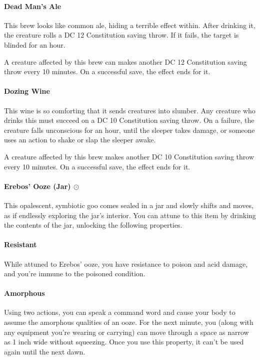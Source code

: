     \paragraph{Dead Man's Ale} %
        This brew looks like common ale, hiding a terrible effect within.
        After drinking it, the creature rolls a DC 12 Constitution saving throw.
        If it fails, the target is blinded for an hour.

        A creature affected by this brew can makes another DC 12 Constitution saving throw every 10 minutes.
        On a successful save, the effect ends for it.
    \paragraph{Dozing Wine} %
        This wine is so comforting that it sends creatures into slumber.
        Any creature who drinks this must succeed on a DC 10 Constitution saving throw.
        On a failure, the creature falls unconscious for an hour, until the sleeper takes damage, or someone uses an action to shake or slap the sleeper awake.

        A creature affected by this brew makes another DC 10 Constitution saving throw every 10 minutes.
        On a successful save, the effect ends for it.
    \paragraph{Erebos' Ooze (Jar) $\odot$} \label{item::erebosooze} %
        This opalescent, symbiotic goo comes sealed in a jar and slowly shifts and moves, as if endlessly exploring the jar's interior.
        You can attune to this item by drinking the contents of the jar, unlocking the following properties.

        \paragraph{Resistant} While attuned to Erebos' ooze, you have resistance to poison and acid damage, and you're immune to the poisoned condition.
        \paragraph{Amorphous} Using two actions, you can speak a command word and cause your body to assume the amorphous qualities of an ooze.
        For the next minute, you (along with any equipment you're wearing or carrying) can move through a space as narrow as 1 inch wide without squeezing.
        Once you use this property, it can't be used again until the next dawn.
